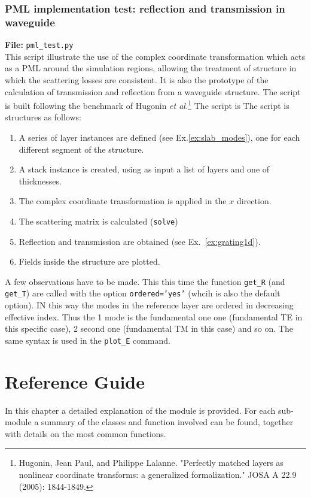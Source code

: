 \documentclass[a4paper,10pt]{report}
\begin{document}
\subsection{PML implementation test: reflection and transmission in waveguide}
\textbf{File:} \texttt{pml\_test.py} \\
This script illustrate the use of the complex coordinate transformation which acts as a PML around the simulation regions, allowing the treatment of structure in which the scattering losses are consistent. It is also the prototype of the calculation of transmission and reflection from a waveguide structure. The script is built following the benchmark of Hugonin \textit{et al.}\footnote{Hugonin, Jean Paul, and Philippe Lalanne. "Perfectly matched layers as nonlinear coordinate transforms: a generalized formalization." JOSA A 22.9 (2005): 1844-1849.} The script is  The script is structures as follows:
\begin{enumerate}
\itemsep0em
\item A series of layer instances are defined (see Ex.\ref{ex:slab_modes}), one for each different segment of the structure. 
\item A stack instance is created, using as input a list of layers and one of thicknesses. 
\item The complex coordinate transformation is applied in the $x$ direction. 
\item The scattering matrix is calculated (\texttt{solve})
\item Reflection and transmission are obtained (see Ex.~\ref{ex:grating1d}).
\item Fields inside the structure are plotted. 
\end{enumerate}
A few observations have to be made. This this time the function \texttt{get\_R} (and \texttt{get\_T}) are called with the option \texttt{ordered='yes'} (whcih is also the default option). IN this way the modes in the reference layer are ordered in decreasing effective index. Thus the 1 mode is the fundamental one one (fundamental TE in this specific case), 2 second one (fundamental TM in this case) and so on. The same syntax is used in the \texttt{plot\_E} command.

 




\chapter{Reference Guide}
In this chapter a detailed explanation of the module is provided. For each sub-module a summary of the classes and function involved can be found, together with details on the most common functions.
\end{document}
